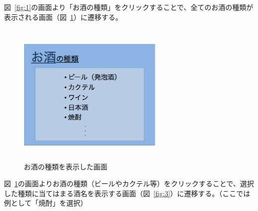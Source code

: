 \documentclass[a4j,titlepage]{jarticle}
\begin{document}
図~\ref{fig:1}の画面より「お酒の種類」をクリックすることで、全てのお酒の種類が表示される画面（図~\ref{fig:2}）に遷移する。
\clearpage
\begin {figure}[!htbp]
    \begin{center}
    \includegraphics [height=7cm, width=7cm]{2.eps}
    \caption {お酒の種類を表示した画面}
    \label {fig:2}
    \end{center}
\end {figure}


図~\ref{fig:2}の画面よりお酒の種類（ビールやカクテル等）をクリックすることで、選択した種類に当てはまる酒名を表示する画面（図~\ref{fig:3}）に遷移する。（ここでは例として「焼酎」を選択）
\end{document}

